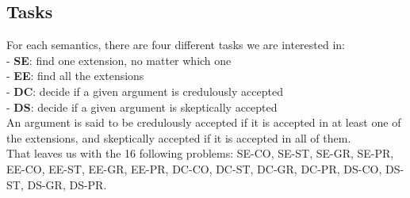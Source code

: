 \documentclass[11pt]{article}
\begin{document}
\subsection{Tasks}
For each semantics, there are four different tasks we are interested in: \\
 - \textbf{SE}: find one extension, no matter which one \\
 - \textbf{EE}: find all the extensions \\
 - \textbf{DC}: decide if a given argument is credulously accepted \\
 - \textbf{DS}: decide if a given argument is skeptically accepted \\
An argument is said to be credulously accepted if it is accepted in at least one of the extensions, and skeptically accepted if it is accepted in all of them. \\
That leaves us with the 16 following problems: SE-CO, SE-ST, SE-GR, SE-PR, EE-CO, EE-ST, EE-GR, EE-PR, DC-CO, DC-ST, DC-GR, DC-PR, DS-CO, DS-ST, DS-GR, DS-PR.
\end{document}
